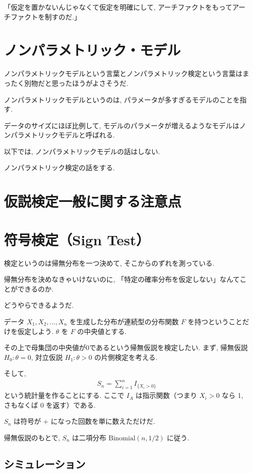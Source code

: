 \documentclass[12pt]{jsarticle}
\begin{document}
「仮定を置かないんじゃなくて仮定を明確にして, アーチファクトをもってアーチファクトを制すのだ.」

\section{ノンパラメトリック・モデル}

ノンパラメトリックモデルという言葉とノンパラメトリック検定という言葉はまったく別物だと思ったほうがよさそうだ.

ノンパラメトリックモデルというのは, パラメータが多すぎるモデルのことを指す.

データのサイズにほぼ比例して, モデルのパラメータが増えるようなモデルはノンパラメトリックモデルと呼ばれる. 

以下では, ノンパラメトリックモデルの話はしない. 

ノンパラメトリック検定の話をする. 

\section{仮説検定一般に関する注意点}



\section{符号検定（Sign Test）}

検定というのは帰無分布を一つ決めて, そこからのずれを測っている. 

帰無分布を決めなきゃいけないのに, 「特定の確率分布を仮定しない」なんてことができるのか. 

どうやらできるようだ.

データ $X_1, X_2, \ldots, X_n$ を生成した分布が連続型の分布関数 $F$ を持つということだけを仮定しよう. $\theta$ を $F$ の中央値とする. 

その上で母集団の中央値が0であるという帰無仮説を検定したい. 
まず, 帰無仮説 $H_0: \theta = 0$, 対立仮説 $H_1: \theta > 0$ の片側検定を考える.

そして, 
\begin{align}
S_n = \sum_{i=1}^{n} I_{\{X_i > 0\}}
\end{align}
という統計量を作ることにする. ここで $I_A$ は指示関数（つまり $X_i > 0$ なら 1, さもなくば 0 を返す）である. 

$S_n$ は符号が + になった回数を単に数えただけだ. 

帰無仮説のもとで, $S_n$ は二項分布 $\mathrm{Binomial}(n, 1/2)$ に従う.

\subsection{シミュレーション}

\end{document}
